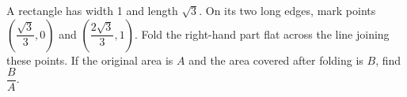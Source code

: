 A rectangle has width 1 and length $\sqrt3 $. On its two long edges, mark points $(\dfrac{\sqrt3}{3},0)$ and $(\dfrac{2\sqrt3}{3},1)$. Fold the right-hand part flat across the line joining these points. If the original area is $ A $ and the area covered after folding is $ B $, find $\dfrac{B}{A}$.
